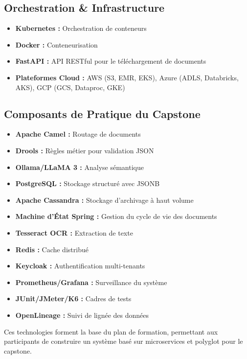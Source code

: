 \documentclass[11pt]{article}
\begin{document}
\subsection{Orchestration \& Infrastructure}
\begin{itemize}
    \item \textbf{Kubernetes :} Orchestration de conteneurs
    \item \textbf{Docker :} Conteneurisation
    \item \textbf{FastAPI :} API RESTful pour le téléchargement de documents
    \item \textbf{Plateformes Cloud :} AWS (S3, EMR, EKS), Azure (ADLS, Databricks, AKS), GCP (GCS, Dataproc, GKE)
\end{itemize}

\subsection{Composants de Pratique du Capstone}
\begin{itemize}
    \item \textbf{Apache Camel :} Routage de documents
    \item \textbf{Drools :} Règles métier pour validation JSON
    \item \textbf{Ollama/LLaMA 3 :} Analyse sémantique
    \item \textbf{PostgreSQL :} Stockage structuré avec JSONB
    \item \textbf{Apache Cassandra :} Stockage d'archivage à haut volume
    \item \textbf{Machine d'État Spring :} Gestion du cycle de vie des documents
    \item \textbf{Tesseract OCR :} Extraction de texte
    \item \textbf{Redis :} Cache distribué
    \item \textbf{Keycloak :} Authentification multi-tenants
    \item \textbf{Prometheus/Grafana :} Surveillance du système
    \item \textbf{JUnit/JMeter/K6 :} Cadres de tests
    \item \textbf{OpenLineage :} Suivi de lignée des données
\end{itemize}

Ces technologies forment la base du plan de formation, permettant aux participants de construire un système basé sur microservices et polyglot pour le capstone.
\end{document}
